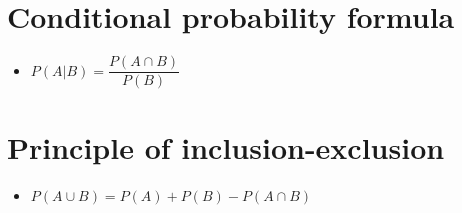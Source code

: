 \section{Conditional probability formula}
\begin{itemize}
	\item $P(A|B) = \dfrac{P(A \cap B)}{P(B)}$
\end{itemize}
\section{Principle of inclusion-exclusion}
\begin{itemize}
	\item $P(A\cup B)=P(A)+P(B)-P(A\cap B)$
\end{itemize}